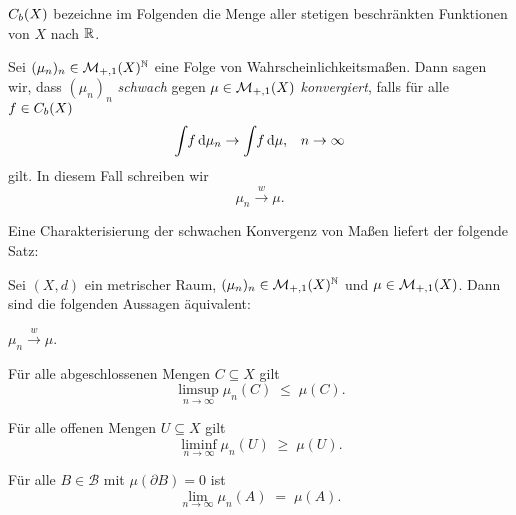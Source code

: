 \documentclass[../main/main.tex]{subfiles}
\begin{document}
	 $C_b(X)$ bezeichne im Folgenden die Menge aller stetigen beschränkten Funktionen von $X$ nach $\mathbb{R}$.

	\begin{Definition}
		Sei $(\mu_n)_n \in \mathcal{M}_{+,1}(X)^{\mathbb{N}}$ eine Folge von Wahrscheinlichkeitsmaßen.
		Dann sagen wir, dass $(\mu_n)_n$ 
		\emph{schwach} gegen $\mu \in \mathcal{M}_{+,1}(X)$ \emph{konvergiert}, falls für alle $f \in C_b(X)$
		$$\int_{} \, f \, \mathrm{d}\mu_n \to \int_{} \, f \, \mathrm{d}\mu\text{,} \quad n \to \infty $$
		gilt. In diesem Fall schreiben wir
		$$\mu_n \xrightarrow{w} \mu \text{.}$$
	\end{Definition}

	Eine Charakterisierung der schwachen Konvergenz von Maßen liefert der folgende Satz:

	\begin{Satz}[Portmanteau]
		Sei $(X, d)$ ein metrischer Raum, $(\mu_n)_n \in \mathcal{M}_{+,1}(X)^{\mathbb{N}}$ 
		und $\mu \in \mathcal{M}_{+,1}(X)$. Dann sind die folgenden Aussagen äquivalent:
		\begin{equivalentthm}
			\item $\mu_n \xrightarrow{w} \mu$.
			\item Für alle abgeschlossenen Mengen $C \subseteq X$ gilt 
				$$\limsup_{n \to \infty} \mu_n(C) \; \leq \; \mu(C) \text{.}$$
			\item Für alle offenen Mengen $U \subseteq X$ gilt 
				$$\liminf_{n \to \infty} \mu_n(U) \; \geq \; \mu(U) \text{.}$$
			\item Für alle $B \in \mathcal{B}$ mit $\mu(\partial B) = 0$ 
				ist $$\lim_{n \to \infty} \mu_n(A) \; = \; \mu(A) \text{.}$$
		\end{equivalentthm}
	\end{Satz}
\end{document}
